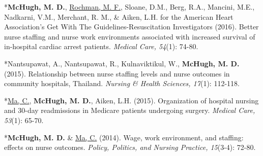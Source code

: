 \documentclass[10pt,]{article}
\begin{document}
{{{{{{{{{{{{{{\begin{hangparas}{.25in}{1}
\end{hangparas}

\vspace{4mm}

\begin{hangparas}{.25in}{1}

*{\textbf {McHugh, M. D.}}, {\underline {Rochman, M. F.}}, Sloane, D.M., Berg, R.A., Mancini, M.E., Nadkarni, V.M., Merchant, R. M., \& Aiken, L.H. for the American Heart Association’s Get With The Guidelines-Resuscitation Investigators (2016). Better nurse staffing and nurse work environments associated with increased survival of in-hospital cardiac arrest patients. {\textit {Medical Care, 54}}(1): 74-80.

\end{hangparas}

\vspace{4mm}

\begin{hangparas}{.25in}{1}

*Nantsupawat, A., Nantsupawat, R., Kulnaviktikul, W., {\textbf {McHugh, M. D.}} (2015). Relationship between nurse staffing levels and nurse outcomes in community hospitals, Thailand. {\textit {Nursing \& Health Sciences, 17}}(1): 112-118.

\end{hangparas}

\vspace{4mm}

\begin{hangparas}{.25in}{1}

*{\underline {Ma, C.}}, {\textbf {McHugh, M. D.}}, Aiken, L.H. (2015). Organization of hospital nursing and 30-day readmissions in Medicare patients undergoing surgery. {\textit {Medical Care, 53}}(1): 65-70.

\end{hangparas}

\vspace{4mm}

\begin{hangparas}{.25in}{1}

*{\textbf {McHugh, M. D.}} \& {\underline {Ma, C.}} (2014). Wage, work environment, and staffing: effects on nurse outcomes. {\textit {Policy, Politics, and Nursing Practice, 15}}(3-4): 72-80.

\end{hangparas}

\vspace{4mm}

}}}}}}}}}}}}}}
\end{document}
